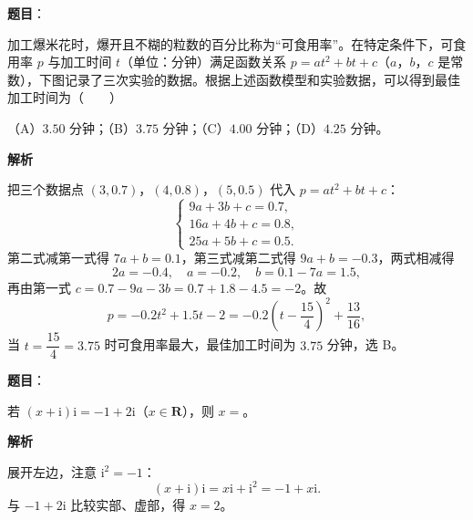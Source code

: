 \begin{answer}

\textbf{题目}：

加工爆米花时，爆开且不糊的粒数的百分比称为“可食用率”。在特定条件下，可食用率 $p$ 与加工时间 $t$（单位：分钟）满足函数关系 $p=at^2+bt+c$（$a$，$b$，$c$ 是常数），下图记录了三次实验的数据。根据上述函数模型和实验数据，可以得到最佳加工时间为\mbox{（　　）}
\nopagebreak[4]
\begin{center}\end{center}
\nopagebreak[4]
（A）$3.50$ 分钟；（B）$3.75$ 分钟；（C）$4.00$ 分钟；（D）$4.25$ 分钟。

\textbf{解析}

把三个数据点 $(3,0.7)$，$(4,0.8)$，$(5,0.5)$ 代入 $p=at^2+bt+c$：
\nopagebreak[4]
\[\begin{cases}
9a+3b+c=0.7,\\
16a+4b+c=0.8,\\
25a+5b+c=0.5 .
\end{cases}\]
第二式减第一式得 $7a+b=0.1$，第三式减第二式得 $9a+b=-0.3$，两式相减得
\nopagebreak[4]
\[2a=-0.4,\quad a=-0.2,\quad b=0.1-7a=1.5,\]
再由第一式 $c=0.7-9a-3b=0.7+1.8-4.5=-2$。故
\nopagebreak[4]
\[p=-0.2t^2+1.5t-2=-0.2\left(t-\frac{15}{4}\right)^2+\frac{13}{16},\]
当 $t=\dfrac{15}{4}=3.75$ 时可食用率最大，最佳加工时间为 $3.75$ 分钟，选 B。


\end{answer}
\begin{answer}

\textbf{题目}：

若 $(x+\mathrm i)\mathrm i=-1+2\mathrm i$（$x\in\mathbf R$），则 $x=$\gkblank{}。

\textbf{解析}

展开左边，注意 $\mathrm i^2=-1$：
\nopagebreak[4]
\[(x+\mathrm i)\mathrm i=x\mathrm i+\mathrm i^2=-1+x\mathrm i .\]
与 $-1+2\mathrm i$ 比较实部、虚部，得 $x=2$。


\end{answer}
